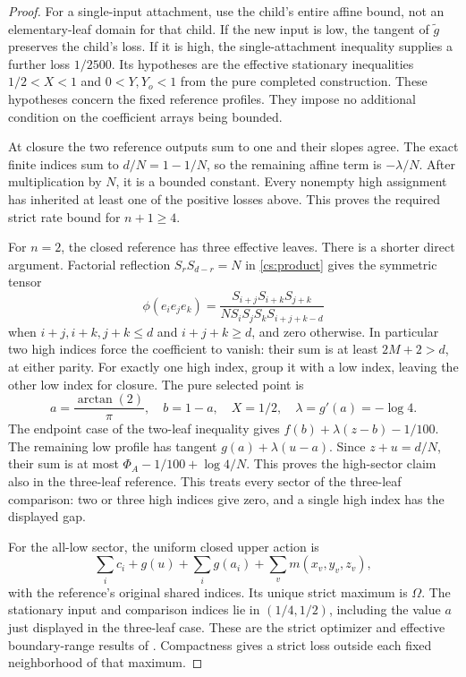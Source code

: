 \begin{proof}
For a single-input attachment, use the child's entire affine bound,
not an elementary-leaf domain for that child. If the new input is low,
the tangent of \(\widetilde g\) preserves the child's loss. If it is
high, the single-attachment inequality supplies a further loss
\(1/2500\). Its hypotheses are the effective stationary inequalities
\(1/2<X<1\) and \(0<Y,Y_o<1\) from the pure completed construction.
These hypotheses concern the fixed reference profiles. They impose no
additional condition on the coefficient arrays being bounded.

At closure the two reference outputs sum to one and their slopes
agree. The exact finite indices sum to \(d/N=1-1/N\), so the
remaining affine term is \(-\lambda/N\). After multiplication by
\(N\), it is a bounded constant. Every nonempty high assignment
has inherited at least one of the positive losses above. This proves
the required strict rate bound for \(n+1\ge4\).

For \(n=2\), the closed reference has three effective leaves.
There is a shorter direct argument. Factorial reflection
\(S_rS_{d-r}=N\) in \eqref{cs:product} gives the symmetric tensor
\begin{equation}\label{cs:trivalent}
 \phi(e_i e_j e_k)=
 \frac{S_{i+j}S_{i+k}S_{j+k}}
 {N S_iS_jS_kS_{i+j+k-d}}
\end{equation}
when
\(i+j,i+k,j+k\le d\) and \(i+j+k\ge d\), and zero otherwise.
In particular two high indices force the coefficient to vanish:
their sum is at least \(2M+2>d\), at either parity. For exactly
one high index, group it with a low index, leaving the other low
index for closure. The pure selected point is
\[
 a=\frac{\arctan(2)}{\pi},\quad b=1-a,\quad X=1/2,\quad
 \lambda=g'(a)=-\log4.
\]
The endpoint case of the two-leaf inequality gives
\(f(b)+\lambda(z-b)-1/100\). The remaining low profile has tangent
\(g(a)+\lambda(u-a)\). Since \(z+u=d/N\), their sum is at most
\(\Phi_A-1/100+\log4/N\). This proves the high-sector claim also
in the three-leaf reference. This treats every sector of the three-leaf comparison: two or three
high indices give zero, and a single high index has the displayed gap.

For the all-low sector, the uniform closed upper action is
\begin{equation}\label{cs:reference-action}
 \sum_i c_i+g(u)+\sum_i g(a_i)+\sum_v m(x_v,y_v,z_v),
\end{equation}
with the reference's original shared indices. Its unique strict
maximum is \(\Omega\). The stationary input and comparison indices
lie in \((1/4,1/2)\), including the value \(a\) just displayed in
the three-leaf case. These are the strict optimizer and effective
boundary-range results of \cite{Newton}. Compactness gives a strict
loss outside each fixed neighborhood of that maximum.


\end{proof}
